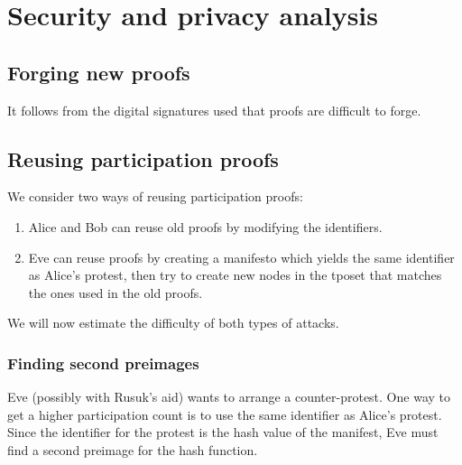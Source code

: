 \mode*

\section{Security and privacy analysis}%
\label{SecurityAnalysis}

\subsection{Forging new proofs}

It follows from the digital signatures used that proofs are difficult to forge.

\subsection{Reusing participation proofs}

We consider two ways of reusing participation proofs:
\begin{enumerate}
  \item Alice and Bob can reuse old proofs by modifying the identifiers.
  \item Eve can reuse proofs by creating a manifesto which yields the same 
    identifier as Alice's protest, then try to create new nodes in the 
    \ac{tposet} that matches the ones used in the old proofs.
\end{enumerate}
We will now estimate the difficulty of both types of attacks.

\subsubsection{Finding second preimages}

Eve (possibly with Rusuk's aid) wants to arrange a counter-protest.
One way to get a higher participation count is to use the same identifier as 
Alice's protest.
Since the identifier for the protest is the hash value of the manifest, Eve 
must find a second preimage for the hash function.


